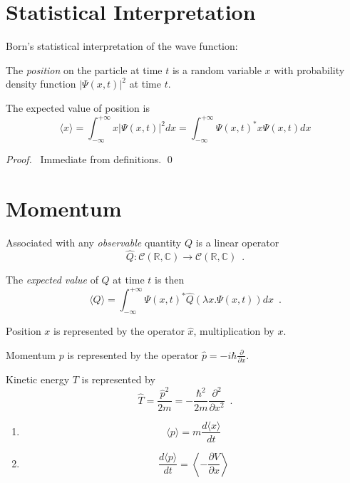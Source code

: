 \section{Statistical Interpretation}

Born's statistical interpretation of the wave function:

The \emph{position} on the particle at time $t$ is a random variable $x$ with probability density function $|\Psi(x,t)|^2$ at time $t$.

\begin{prop}
The expected value of position is
\[ \langle x \rangle = \int_{- \infty}^{+ \infty} x |\Psi(x,t)|^2 dx = \int_{-\infty}^{+ \infty} \Psi(x,t)^* x \Psi(x,t) dx \]
\end{prop}

\begin{proof}
\pf\ Immediate from definitions. \qed
\end{proof}

\section{Momentum}

Associated with any \emph{observable} quantity $Q$ is a linear operator
\[ \hat{Q} : \mathcal{C}(\mathbb{R}, \mathbb{C}) \rightarrow \mathcal{C}(\mathbb{R}, \mathbb{C}) \enspace .\]

The \emph{expected value} of $Q$ at time $t$ is then
\[ \langle Q \rangle = \int_{-\infty}^{+ \infty} \Psi(x,t)^* \hat{Q}(\lambda x. \Psi(x,t)) dx \enspace . \]

Position $x$ is represented by the operator $\hat{x}$, multiplication by $x$.

Momentum $p$ is represented by the operator $\hat{p} = - i \hbar \frac{\partial}{\partial x}$.

Kinetic energy $T$ is represented by
\[ \hat{T} = \frac{\hat{p}^2}{2m} = - \frac{\hbar^2}{2m} \frac{\partial^2}{\partial x^2} \enspace . \]

\begin{prop}
\begin{enumerate}
\item \[ \langle p \rangle = m \frac{d \langle x \rangle}{dt} \]
\item \[ \frac{d \langle p \rangle}{dt} = \left\langle - \frac{\partial V}{\partial x} \right\rangle \]
\end{enumerate}
\end{prop}

